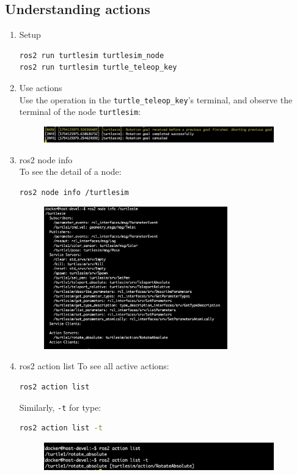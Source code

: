 \documentclass[12pt, a4paper]{article}
\begin{document}
\subsection{Understanding actions}
\begin{enumerate}
	\item Setup
\begin{lstlisting}[language=bash]
ros2 run turtlesim turtlesim_node
ros2 run turtlesim turtle_teleop_key
\end{lstlisting}
\item Use actions\\
Use the operation in the \texttt{turtle\_teleop\_key}'s terminal, and observe the terminal of the node \texttt{turtlesim}:
\begin{figure}[h]
	\setlength{\leftskip}{2.4em}
	\includegraphics[width=0.94\textwidth]{p1.7-1}
\end{figure}
\item ros2 node info\\
To see the detail of a node:
\begin{lstlisting}[language=bash]
ros2 node info /turtlesim
\end{lstlisting}
\begin{figure}[h]
	\centering
	\includegraphics[width=0.75\textwidth]{p1.7-2}
\end{figure}
\item ros2 action list
To see all active actions:
\begin{lstlisting}[language=bash]
ros2 action list
\end{lstlisting}
Similarly, \texttt{-t} for type:
\begin{lstlisting}[language=bash]
ros2 action list -t
\end{lstlisting}
\begin{figure}[h]
	\setlength{\leftskip}{2.4em}
	\includegraphics[width=0.94\textwidth]{p1.7-3}
\end{figure}


\end{enumerate}
\end{document}
